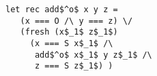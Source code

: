 \begin{figure}[!t]
  \centering
  \begin{minipage}{0.6\columnwidth}
    \begin{lstlisting}[language=ocanren1,frame=tb]
 let rec add$^o$ x y z = 
   (x === O /\ y === z) \/
   (fresh (x$_1$ z$_1$)
     (x === S x$_1$ /\
      add$^o$ x$_1$ y z$_1$ /\
      z === S z$_1$) )
    \end{lstlisting}
  \end{minipage}
\end{figure}